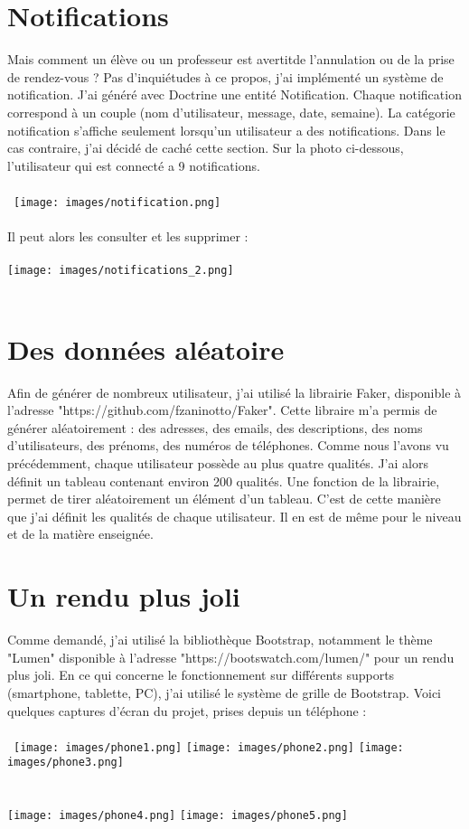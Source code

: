 \documentclass{article}%
\begin{document}
\section{Notifications}
Mais comment un élève ou un professeur est avertitde l'annulation ou de la prise de rendez-vous ? Pas d'inquiétudes à ce propos, j'ai implémenté un système de notification. J'ai généré avec Doctrine une entité Notification. Chaque notification correspond à un couple (nom d'utilisateur, message, date, semaine). La catégorie notification s'affiche seulement lorsqu'un utilisateur a des notifications. Dans le cas contraire, j'ai décidé de caché cette section. Sur la photo ci-dessous, l'utilisateur qui est connecté a 9 notifications. \\\\\
\texttt{[image: images/notification.png]}
\\\\
Il peut alors les consulter et les supprimer : \\\\
\texttt{[image: images/notifications\_2.png]}
\\\\
\section{Des données aléatoire}
Afin de générer de nombreux utilisateur, j'ai utilisé la librairie Faker, disponible à l'adresse "https://github.com/fzaninotto/Faker". Cette libraire m'a permis de générer aléatoirement : des adresses, des emails, des descriptions, des noms d'utilisateurs, des prénoms, des numéros de téléphones. Comme nous l'avons vu précédemment, chaque utilisateur possède au plus quatre qualités. J'ai alors définit un tableau contenant environ 200 qualités. Une fonction de la librairie, permet de tirer aléatoirement un élément d'un tableau. C'est de cette manière que j'ai définit les qualités de chaque utilisateur. Il en est de même pour le niveau et de la matière enseignée.
\section{Un rendu plus joli}
Comme demandé, j'ai utilisé la bibliothèque Bootstrap, notamment le thème "Lumen" disponible à  l'adresse "https://bootswatch.com/lumen/" pour un rendu plus joli.
En ce qui concerne le fonctionnement sur différents supports (smartphone, tablette, PC), j'ai utilisé le système de grille de Bootstrap.
Voici quelques captures d'écran du projet, prises depuis un téléphone : \\\\\
\texttt{[image: images/phone1.png]}
\texttt{[image: images/phone2.png]}
\texttt{[image: images/phone3.png]}\\\\\\
\texttt{[image: images/phone4.png]}
\texttt{[image: images/phone5.png]}
\end{document}
